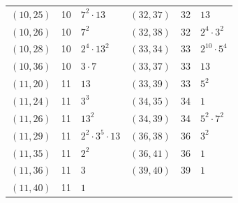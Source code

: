 \documentclass[11pt]{article}
\begin{document}
\begin{longtable}{@{}lrl@{\qquad}lrl@{}}
$(10,25)$ & 10 & $7^{2}\cdot 13$ & $(32,37)$ & 32 & $13$\\
$(10,26)$ & 10 & $7^{2}$ & $(32,38)$ & 32 & $2^{4}\cdot 3^{2}$\\
$(10,28)$ & 10 & $2^{4}\cdot 13^{2}$ & $(33,34)$ & 33 & $2^{10}\cdot 5^{4}$\\
$(10,36)$ & 10 & $3\cdot 7$ & $(33,37)$ & 33 & $13$\\
$(11,20)$ & 11 & $13$ & $(33,39)$ & 33 & $5^{2}$\\
$(11,24)$ & 11 & $3^{3}$ & $(34,35)$ & 34 & $1$\\
$(11,26)$ & 11 & $13^{2}$ & $(34,39)$ & 34 & $5^{2}\cdot 7^{2}$\\
$(11,29)$ & 11 & $2^{2}\cdot 3^{5}\cdot 13$ & $(36,38)$ & 36 & $3^{2}$\\
$(11,35)$ & 11 & $2^{2}$ & $(36,41)$ & 36 & $1$\\
$(11,36)$ & 11 & $3$ & $(39,40)$ & 39 & $1$\\
$(11,40)$ & 11 & $1$ & & &\\
\end{longtable}
\endgroup
\end{document}
